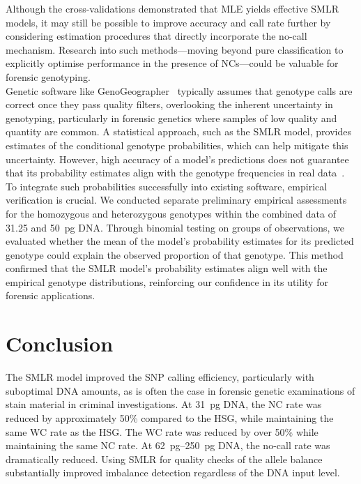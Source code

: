 \documentclass[preprint,5p,times,11pt]{elsarticle}
\begin{document}
Although the cross-validations demonstrated that MLE yields effective SMLR models, it may still be possible to improve accuracy and call rate further by considering estimation procedures that directly incorporate the no-call mechanism.
Research into such methods---moving beyond pure classification to explicitly optimise performance in the presence of NCs---could be valuable for forensic genotyping.\\


Genetic software like GenoGeographer~\cite{tvede18, tvede17, genogeographer} typically assumes that genotype calls are correct once they pass quality filters, overlooking the inherent uncertainty in genotyping, particularly in forensic genetics where samples of low quality and quantity are common.
A statistical approach, such as the SMLR model, provides estimates of the conditional genotype probabilities, which can help mitigate this uncertainty.
However, high accuracy of a model's predictions does not guarantee that its probability estimates align with the genotype frequencies in real data~\cite{shmueli}.
To integrate such probabilities successfully into existing software, empirical verification is crucial.
We conducted separate preliminary empirical assessments for the homozygous and heterozygous genotypes within the combined data of 31.25 and \SI{50}{\pg} DNA.
Through binomial testing on groups of observations, we evaluated whether the mean of the model’s probability estimates for its predicted genotype could explain the observed proportion of that genotype.
This method confirmed that the SMLR model's probability estimates align well with the empirical genotype distributions, reinforcing our confidence in its utility for forensic applications.



\section{Conclusion}
The SMLR model improved the SNP calling efficiency, particularly with suboptimal DNA amounts, as is often the case in forensic genetic examinations of stain material in criminal investigations.
At \SI{31}{\pg} DNA, the NC rate was reduced by approximately 50\% compared to the HSG, while maintaining the same WC rate as the HSG.
The WC rate was reduced by over 50\% while maintaining the same NC rate.
At \SIrange[range-units = single, range-phrase = --]{62}{250}{\pg} DNA, the no-call rate was dramatically reduced.
Using SMLR for quality checks of the allele balance substantially improved imbalance detection regardless of the DNA input level.
\end{document}
